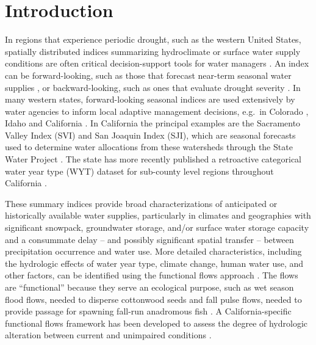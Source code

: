 \documentclass[hess, manuscript]{copernicus}
\begin{document}
\section{Introduction}

In regions that experience periodic drought, such as the western United
States, spatially distributed indices summarizing hydroclimate or
surface water supply conditions are often critical decision-support
tools for water managers \citep[e.g.,][]{Garen1993}. An index can be
forward-looking, such as those that forecast near-term seasonal water
supplies \citep[e.g.,][]{Null2013, Verley2020}, or backward-looking,
such as ones that evaluate drought severity
\citep[e.g.,][]{Palmer1965, Guttman1998a, McKee1993, Wilhite1985, Wilhite2000}.
In many western states, forward-looking seasonal indices are used
extensively by water agencies to inform local adaptive management
decisions, e.g.~in Colorado \citep{ColoradoDWR2023}, Idaho
\citep{NRCS2023} and California \citep{Null2013}. In
California the principal examples are the Sacramento Valley Index (SVI)
and San Joaquin Index (SJI), which are seasonal forecasts used to
determine water allocations from these watersheds through the State
Water Project \citep{DWR2022}. The state has more recently
published a retroactive categorical water year type (WYT) dataset for
sub-county level regions throughout California
\citep{DWR2021a}.

These summary indices provide broad characterizations of anticipated or
historically available water supplies, particularly in climates and
geographies with significant snowpack, groundwater storage, and/or
surface water storage capacity and a consummate delay -- and possibly
significant spatial transfer -- between precipitation occurrence and
water use. More detailed characteristics, including the hydrologic
effects of water year type, climate change, human water use, and other
factors, can be identified using the functional flows approach
\citep[e.g.,][]{Poff1997, Bunn2002, Poff2010, Wheeler2018}. The flows
are ``functional'' because they serve an ecological purpose, such as wet
season flood flows, needed to disperse cottonwood seeds
\citep{Mahoney1998} and fall pulse flows, needed to provide passage for
spawning fall-run anadromous fish \citep{Moyle2002a}. A
California-specific functional flows framework has been developed to
assess the degree of hydrologic alteration between current and
unimpaired conditions \citep{Yarnell2020, Patterson2020}.
\end{document}
